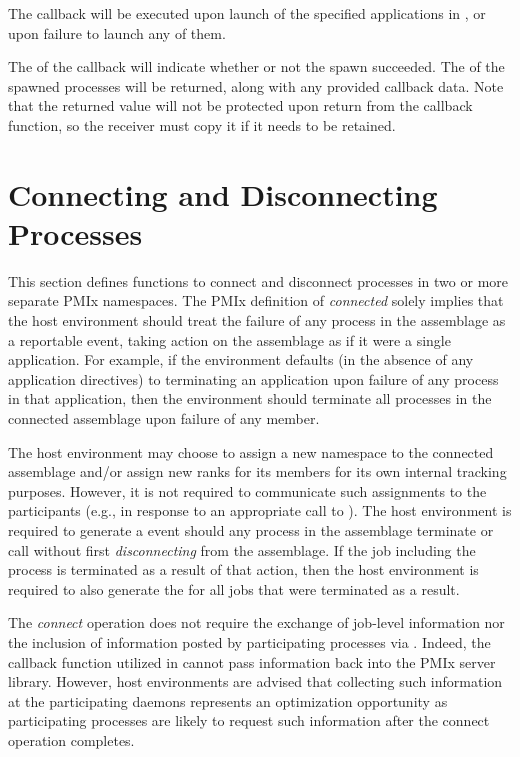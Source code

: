 \descr

The callback will be executed upon launch of the specified applications in , or upon failure to launch any of them.

The  of the callback will indicate whether or not the spawn succeeded.
The  of the spawned processes will be returned, along with any provided callback data.
Note that the returned  value will not be protected upon return from the callback function, so the receiver must copy it if it needs to be retained.



\section{Connecting and Disconnecting Processes}
\label{chap:api_proc_mgmt:connect}

This section defines functions to connect and disconnect processes in two or more separate \ac{PMIx} namespaces. The \ac{PMIx} definition of \textit{connected} solely implies that the host environment should treat the failure of any process in the assemblage as a reportable event, taking action on the assemblage as if it were a single application. For example, if the environment defaults (in the absence of any application directives) to terminating an application upon failure of any process in that application, then the environment should terminate all processes in the connected assemblage upon failure of any member.

The host environment may choose to assign a new namespace to the connected assemblage and/or assign new ranks for its members for its own internal tracking purposes. However, it is not required to communicate such assignments to the participants (e.g., in response to an appropriate call to ). The host environment is required to generate a  event should any process in the assemblage terminate or call  without first \textit{disconnecting} from the assemblage. If the job including the process is terminated as a result of that action, then the host environment is required to also generate the  for all jobs that were terminated as a result.

\advicermstart
The \textit{connect} operation does not require the exchange of job-level information nor the inclusion of information posted by  participating processes via . Indeed, the callback function utilized in  cannot pass information back into the \ac{PMIx} server library. However, host environments are advised that collecting such information at the participating daemons represents an optimization opportunity as participating processes are likely to request such information after the connect operation completes.
\advicermend

